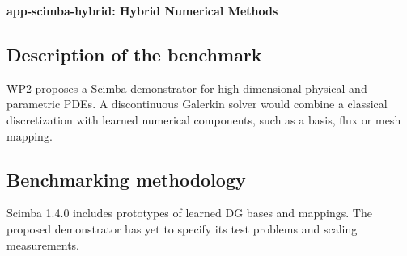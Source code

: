 \textbf{app-scimba-hybrid: Hybrid Numerical Methods}
\label{sec:app:specs:app-scimba-hybrid}



\subsection{Description of the benchmark}
WP2 proposes a Scimba demonstrator for high-dimensional physical and
parametric PDEs. A discontinuous Galerkin solver would combine a
classical discretization with learned numerical components, such as a
basis, flux or mesh mapping.

\subsection{Benchmarking methodology}
Scimba 1.4.0 includes prototypes of learned DG bases and mappings.
The proposed demonstrator has yet to specify its test problems and
scaling measurements.
